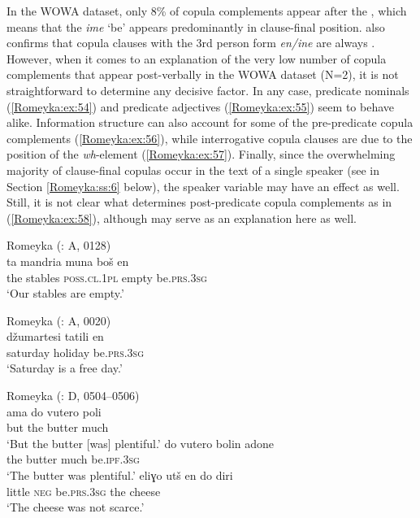 \documentclass[output=paper,colorlinks,citecolor=brown]{langscibook}
\begin{document}
In the WOWA dataset, only 8\% of copula complements appear after the , which means that the  \textit{ime} `be' appears predominantly in clause-final position. \citet[117]{neocleous_word_2020} also confirms that copula clauses with the 3rd person form \textit{en/ine} are always . However, when it comes to an explanation of the very low number of copula complements that appear post-verbally in the WOWA dataset (N=2), it is not straightforward to determine any decisive factor. In any case, predicate nominals (\ref{Romeyka:ex:54}) and predicate adjectives (\ref{Romeyka:ex:55}) seem to behave alike. Information structure can also account for some of the pre-predicate copula complements (\ref{Romeyka:ex:56}), while interrogative copula clauses are  due to the  position of the \textit{wh}-element (\ref{Romeyka:ex:57}). Finally, since the overwhelming majority of clause-final copulas occur in the text of a single speaker (see  in Section \ref{Romeyka:ss:6} below), the speaker variable may have an effect as well. Still, it is not clear what determines post-predicate copula complements as in (\ref{Romeyka:ex:58}), although  may serve as an explanation here as well.

\ea\label{Romeyka:ex:54}
Romeyka (\citealt{schreiber2021pontic}: A, 0128) \\
\gll ta mandria muna boš en \\
the stables \textsc{poss.cl.1pl} empty be\textsc{.prs.3sg} \\
\glt `Our stables are empty.'  \\
\z

\ea\label{Romeyka:ex:55}
Romeyka (\citealt{schreiber2021pontic}: A, 0020) \\
\gll džumartesi tatili en \\
saturday holiday be\textsc{.prs.3sg} \\
\glt `Saturday is a free day.'  \\
\z

\ea\label{Romeyka:ex:56}
\ea\label{Romeyka:ex:56a}
Romeyka (\citealt{schreiber2021pontic}: D, 0504--0506) \\
\gll ama do vutero poli \\
but the butter much \\
\glt `But the butter [was] plentiful.'
\ex\label{Romeyka:ex:56b}
\gll do vutero bolin adone \\
the butter much be\textsc{.ipf.3sg} \\
\glt `The butter was plentiful.'
\ex\label{Romeyka:ex:56c}
\gll eliɣo utš en do diri \\
little \textsc{neg} be\textsc{.prs.3sg} the cheese \\
\glt `The cheese was not scarce.' 
\z
\z
\end{document}
